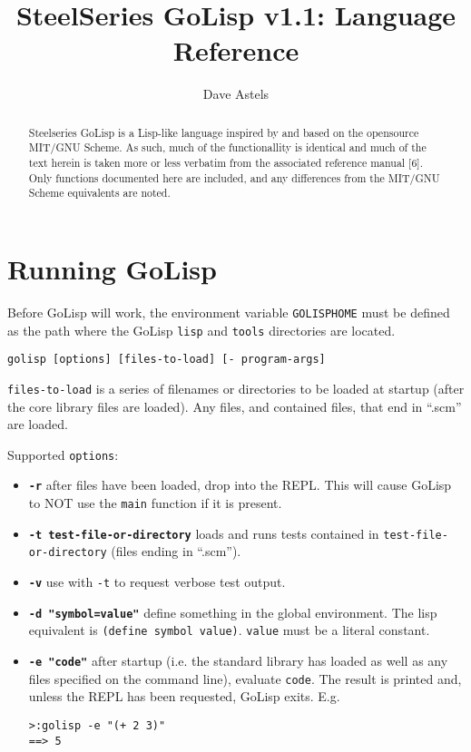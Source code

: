 \documentclass{article}
\title{SteelSeries GoLisp v1.1: Language Reference}
\author{Dave Astels}
\begin{document}
\maketitle

\begin{abstract}
  Steelseries GoLisp is a Lisp-like language inspired by and based on the opensource MIT/GNU
  Scheme. As such, much of the functionallity is identical and much of the text herein is
  taken more or less verbatim from the associated reference manual [6]. Only functions
  documented here are included, and any differences from the MIT/GNU Scheme equivalents are
  noted.
\end{abstract}

\section{Running GoLisp}\label{sec:running-golisp}

Before GoLisp will work, the environment variable \verb|GOLISPHOME| must be defined as the
path where the GoLisp \verb|lisp| and \verb|tools| directories are located.

\begin{verbatim}
golisp [options] [files-to-load] [- program-args]
\end{verbatim}

\verb|files-to-load| is a series of filenames or directories to be loaded at startup (after
the core library files are loaded). Any files, and contained files, that end in ``.scm'' are
loaded.

Supported \verb|options|:

\begin{itemize}
\item {\bf\verb|-r|} after files have been loaded, drop into the REPL. This will cause GoLisp
  to NOT use the \verb|main| function if it is present.
\item {\bf\verb|-t test-file-or-directory|} loads and runs tests contained in
  \verb|test-file-or-directory| (files ending in ``.scm'').
\item {\bf\verb|-v|} use with \verb|-t| to request verbose test output.
\item {\bf\verb|-d "symbol=value"|} define something in the global environment. The lisp
  equivalent is \verb|(define symbol value)|. \verb|value| must be a literal constant.
\item {\bf\verb|-e "code"|} after startup (i.e. the standard library has loaded as well as any
  files specified on the command line), evaluate \verb|code|. The result is printed and,
  unless the REPL has been requested, GoLisp exits. E.g.
\begin{verbatim}
>:golisp -e "(+ 2 3)"
==> 5
\end{verbatim}
\end{itemize}
\end{document}
